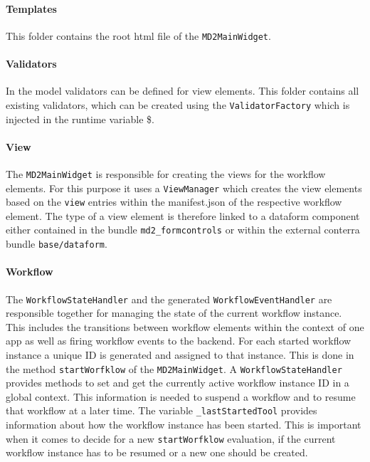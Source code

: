 \paragraph{Templates}
This folder contains the root html file of the \lstinline|MD2MainWidget|.

\paragraph{Validators}
In the model validators can be defined for view elements. This folder contains all existing validators, which can be created using the \lstinline|ValidatorFactory| which is injected in the runtime variable \$.

\paragraph{View}
The \lstinline|MD2MainWidget| is responsible for creating the views for the workflow elements. For this purpose it uses a \lstinline|ViewManager| which creates the view elements based on the \lstinline|view| entries within the manifest.json of the respective workflow element. The type of a view element is therefore linked to a dataform component either contained in the bundle \lstinline|md2_formcontrols| or within the external conterra bundle \lstinline|base/dataform|.

\paragraph{Workflow}\label{par:workflowStateHandler}
The \lstinline|WorkflowStateHandler| and the generated \lstinline|WorkflowEventHandler| are responsible together for managing the state of the current workflow instance. This includes the transitions between workflow elements within the context of one app as well as firing workflow events to the backend.  
For each started workflow instance a unique ID is generated and assigned to that instance. This is done in the method \lstinline!startWorfklow! of the \lstinline!MD2MainWidget!. A \lstinline!WorkflowStateHandler! provides methods to set and get the currently active workflow instance ID in a global context. This information is needed to suspend a workflow and to resume that workflow at a later time. The variable \lstinline|_lastStartedTool| provides information about how the workflow instance has been started. This is important when it comes to decide for a new \lstinline!startWorfklow! evaluation, if the current workflow instance has to be resumed or a new one should be created.

